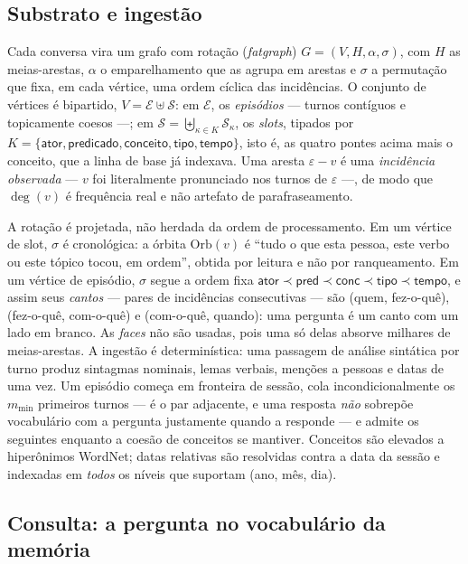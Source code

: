 \subsection{Substrato e ingestão}
\label{sec:metodo:substrato}

Cada conversa vira um grafo com rotação (\emph{fatgraph})
$G=(V,H,\alpha,\sigma)$, com $H$ as meias-arestas, $\alpha$ o emparelhamento que
as agrupa em arestas e $\sigma$ a permutação que fixa, em cada vértice, uma ordem
cíclica das incidências. O conjunto de vértices é bipartido,
$V=\mathcal{E}\uplus\mathcal{S}$: em $\mathcal{E}$, os \emph{episódios} --- turnos
contíguos e topicamente coesos ---; em $\mathcal{S}=\biguplus_{\kappa\in K}
\mathcal{S}_\kappa$, os \emph{slots}, tipados por $K=\{\textsf{ator},
\textsf{predicado},\textsf{conceito},\textsf{tipo},\textsf{tempo}\}$, isto é, as
quatro pontes acima mais o conceito, que a linha de base já indexava. Uma aresta
$\varepsilon\!-\!v$ é uma \emph{incidência observada} --- $v$ foi literalmente
pronunciado nos turnos de $\varepsilon$ ---, de modo que $\deg(v)$ é frequência
real e não artefato de parafraseamento.

A rotação é projetada, não herdada da ordem de processamento. Em um vértice de
slot, $\sigma$ é cronológica: a órbita $\mathrm{Orb}(v)$ é ``tudo o que esta
pessoa, este verbo ou este tópico tocou, em ordem'', obtida por leitura e não por
ranqueamento. Em um vértice de episódio, $\sigma$ segue a ordem fixa
$\textsf{ator}\prec\textsf{pred}\prec\textsf{conc}\prec\textsf{tipo}\prec
\textsf{tempo}$, e assim seus \emph{cantos} --- pares de incidências consecutivas
--- são (quem, fez-o-quê), (fez-o-quê, com-o-quê) e (com-o-quê, quando): uma
pergunta é um canto com um lado em branco. As \emph{faces} não são usadas, pois
uma só delas absorve milhares de meias-arestas. A ingestão é determinística: uma
passagem de análise sintática por turno produz sintagmas nominais, lemas verbais,
menções a pessoas e datas de uma vez. Um episódio começa em fronteira de sessão,
cola incondicionalmente os $m_{\min}$ primeiros turnos --- é o par adjacente, e
uma resposta \emph{não} sobrepõe vocabulário com a pergunta justamente quando a
responde --- e admite os seguintes enquanto a coesão de conceitos se mantiver.
Conceitos são elevados a hiperônimos WordNet; datas relativas são resolvidas
contra a data da sessão e indexadas em \emph{todos} os níveis que suportam (ano,
mês, dia).

\subsection{Consulta: a pergunta no vocabulário da memória}
\label{sec:metodo:consulta}

